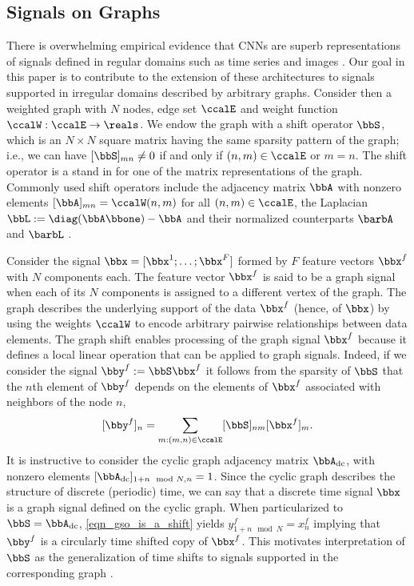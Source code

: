 %
\subsection{Signals on Graphs}\label{sec_cnn_graph signals}

There is overwhelming empirical evidence that CNNs are superb representations of signals defined in regular domains such as time series and images \cite{lecun15-deeplearning}. Our goal in this paper is to contribute to the extension of these architectures to signals supported in irregular domains described by arbitrary graphs. Consider then a weighted graph with $N$ nodes, edge set $\ccalE$ and weight function $\ccalW: \ccalE \to \reals$. We endow the graph with a shift operator $\bbS$, which is an $N\times N$ square matrix having the same sparsity pattern of the graph; i.e., we can have $[\bbS]_{mn}\neq 0$ if and only if $(n,m) \in \ccalE$ or $m=n$. The shift operator is a stand in for one of the matrix representations of the graph. Commonly used shift operators include the adjacency matrix $\bbA$ with nonzero elements $[\bbA]_{mn}=\ccalW(n,m)$ for all $(n,m)\in \ccalE$, the Laplacian $\bbL:=\diag(\bbA \bbone)-\bbA$ and their normalized counterparts $\barbA$ and $\barbL$ \cite{shuman13-mag}. 

Consider the signal $\bbx=[\bbx^1;\ldots;\bbx^F]$ formed by $F$ feature vectors $\bbx^f$ with $N$ components each. The feature vector $\bbx^f$ is said to be a graph signal when each of its $N$ components is assigned to a different vertex of the graph. The graph describes the underlying support of the data $\bbx^f$ (hence, of $\bbx$) by using the weights $\ccalW$ to encode arbitrary pairwise relationships between data elements. The graph shift enables processing of the graph signal $\bbx^f$ because it defines a local linear operation that can be applied to graph signals. Indeed, if we consider the signal $\bby^f:=\bbS\bbx^f$ it follows from the sparsity of $\bbS$ that the $n$th element of $\bby^f$ depends on the elements of $\bbx^f$ associated with neighbors of the node $n$,
% 
\begin{equation}\label{eqn_gso_is_a_shift}
   [\bby^f]_n =  \sum_{m:(m,n)\in\ccalE} [\bbS]_{nm} [\bbx^f]_m.
\end{equation}
%
It is instructive to consider the cyclic graph adjacency matrix $\bbA_{\dc}$, with nonzero elements $[\bbA_{\dc}]_{1 + n \mod N, n}=1$. Since the cyclic graph describes the structure of discrete (periodic) time, we can say that a discrete time signal $\bbx$ is a graph signal defined on the cyclic graph. When particularized to $\bbS=\bbA_{\dc}$, \eqref{eqn_gso_is_a_shift} yields ${y^f_{1+n\mod N}}=x^f_n$ implying that $\bby^f$ is a circularly time shifted copy of $\bbx^f$. This motivates interpretation of $\bbS$ as the generalization of time shifts to signals supported in the corresponding graph \cite{sandryhaila13-dspg}.

